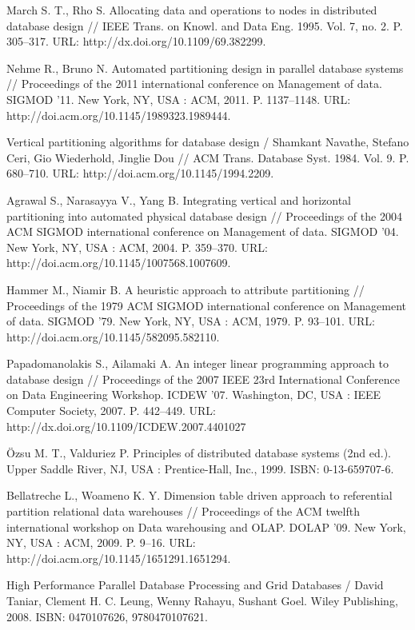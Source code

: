 \documentclass[unicode]{beamer}
\begin{document}
\begin{frame}[allowframebreaks]
{\begin{thebibliography}{99}
 March S. T., Rho S. Allocating data and operations to nodes in distributed database design // IEEE Trans. on Knowl. and Data Eng. 1995. Vol. 7, no. 2. P. 305--317. URL: http://dx.doi.org/10.1109/69.382299.

 Nehme R., Bruno N. Automated partitioning design in parallel database systems // Proceedings of the 2011 international conference on Management of data. SIGMOD ’11. New York, NY, USA : ACM, 2011. P. 1137--1148. URL: http://doi.acm.org/10.1145/1989323.1989444.

 Vertical partitioning algorithms for database design / Shamkant Navathe, Stefano Ceri, Gio Wiederhold, Jinglie Dou // ACM Trans. Database Syst. 1984. Vol. 9. P. 680--710. URL: http://doi.acm.org/10.1145/1994.2209.

 Agrawal S., Narasayya V., Yang B. Integrating vertical and horizontal partitioning into automated physical database design // Proceedings of the 2004 ACM SIGMOD international conference on Management of data. SIGMOD ’04. New York, NY, USA : ACM, 2004. P. 359--370. URL: http://doi.acm.org/10.1145/1007568.1007609.

 Hammer M., Niamir B. A heuristic approach to attribute partitioning // Proceedings of the 1979 ACM SIGMOD international conference on Management of data. SIGMOD ’79. New York, NY, USA : ACM, 1979. P. 93--101. URL: http://doi.acm.org/10.1145/582095.582110.

 Papadomanolakis S., Ailamaki A. An integer linear programming approach to database design // Proceedings of the 2007 IEEE 23rd International Conference on Data Engineering Workshop. ICDEW ’07. Washington, DC, USA : IEEE Computer Society, 2007. P. 442--449. URL: http://dx.doi.org/10.1109/ICDEW.2007.4401027

 {\"O}zsu M. T., Valduriez P. Principles of distributed database systems (2nd ed.). Upper Saddle River, NJ, USA : Prentice-Hall, Inc., 1999. ISBN: 0-13-659707-6.

 Bellatreche L., Woameno K. Y. Dimension table driven approach to referential partition relational data warehouses // Proceedings of the ACM twelfth international workshop on Data warehousing and OLAP. DOLAP ’09. New York, NY, USA : ACM, 2009. P. 9--16. URL: http://doi.acm.org/10.1145/1651291.1651294.

 High Performance Parallel Database Processing and Grid Databases / David Taniar, Clement H. C. Leung, Wenny Rahayu, Sushant Goel. Wiley Publishing, 2008. ISBN: 0470107626, 9780470107621.


\end{thebibliography}}
\end{frame}
\end{document}
